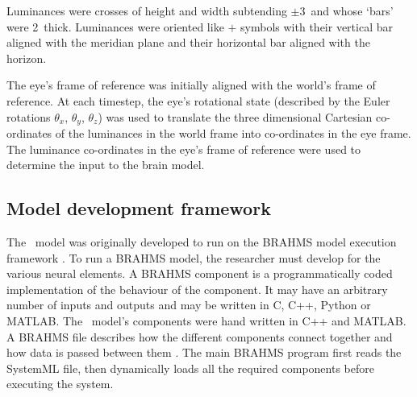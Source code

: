\documentclass{frontiersSCNS}
\begin{document}
Luminances were crosses of height and width subtending $\pm$3\dg~and
whose `bars' were 2\dg~thick. Luminances were oriented like $+$
symbols with their vertical bar aligned with the meridian plane and
their horizontal bar aligned with the horizon.

The eye's frame of reference was initially aligned with the world's
frame of reference.  At each timestep, the eye's rotational state
(described by the Euler rotations $\theta_x$, $\theta_y$, $\theta_z$)
was used to translate the three dimensional Cartesian co-ordinates of
the luminances in the world frame into co-ordinates in the eye
frame. The luminance co-ordinates in the eye's frame of reference were
used to determine the input to the brain model.

\subsection{Model development framework}

The \ccg~model was originally developed to run on the BRAHMS model
execution framework
\citep{mitchinson_brahms:_2010,mitchinson_brahms_2015}. To run a
BRAHMS model, the researcher must develop  for
the various neural elements. A BRAHMS component is a programmatically
coded implementation of the behaviour of the component. It may have an
arbitrary number of inputs and outputs and may be written in C, C++,
Python or MATLAB. The \ccg~model's components were hand written in C++
and MATLAB. A BRAHMS  file describes how the different
components connect together and how data is passed between them
\citep{mitchinson_brahms:_2010}. The main BRAHMS program first
reads the SystemML file, then dynamically loads all the required
components before executing the system.
\end{document}
